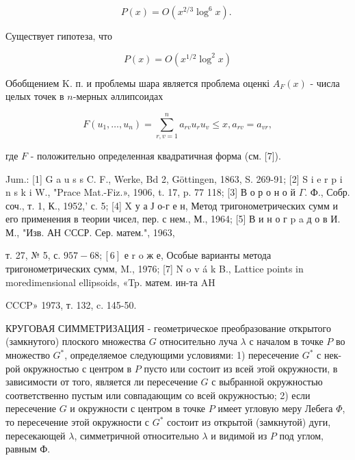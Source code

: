 \documentclass[10pt]{article}
\begin{document}
\[

P(x)=O\left(x^{2 / 3} \log ^{6} x\right) \text {. }

\]



Существует гипотеза, что



\[

P(x)=O\left(x^{1 / 2} \log ^{2} x\right)

\]



Обобщением K. п. и проблемы шара является проблема оценкі $A_{F}(x)$ - числа целых точек в $n$-мерных әллипсоидах



\[

F\left(u_{1}, \ldots, u_{n}\right)=\sum_{r, v=1}^{n} a_{r v} u_{r} u_{v} \leqslant x, a_{r v}=a_{v r},

\]



где $F$ - положительно определенная квадратичная форма (см. [7]).



Jum.: [1] G a u s s C. F., Werke, Bd 2, Göttingen, 1863, S. 269-91; [2] S i e r p i n s k i W., "Prace Mat.-Fiz.», 1906, t. 17, p. 77 118; [3] В о р о н о й $\Gamma$. Ф., Собр. соч., т. 1, К., 1952,' с. 5; [4] X у а Ј о-г е н, Метод тригонометрических сумм и его применения в теории чисел, пер. с нем., М., 1964; [5] В и н о г p a д о в И. М., "Изв. АН CССР. Сер. матем.", 1963,

т. 27, № 5, с. $957-68 ;[6]$ е r o ж е, Особые варианты метода тригонометрических сумм, M., 1976; [7] N o v á k B., Lattice points in moredimensional ellipsoids, «Tp. матем. ин-та AH

CCCP» 1973, т. 132, c. 145-50.



КРУГОВАЯ СИММЕТРИЗАЦИЯ - геометрическое преобразование открытого (замкнутого) плоского множества $G$ относительно луча $\lambda$ с началом в точке $P$ во множество $G^{*}$, определяемое следующими условиями: 1) пересечение $G^{*}$ с нек-рой окружностью с центром в $P$ пусто или состоит из всей этой окружности, в зависимости от того, является ли пересечение $G$ с выбранной окружностью соответственно пустым или совпадающим со всей окружностью; 2) если пересечение $G$ и окружности с центром в точке $P$ имеет угловую меру Лебега $\Phi$, то пересечение этой окружности с $G^{*}$ состоит из открытой (замкнутой) дуги, пересекающей $\lambda$, симметричной относительно $\lambda$ и видимой из $P$ под углом, равным Ф.
\end{document}
